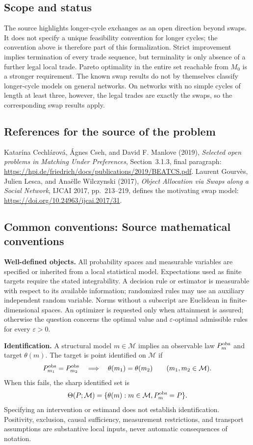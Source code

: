 \documentclass[11pt,a4paper]{article}
\begin{document}
\subsection*{Scope and status}
The source highlights longer-cycle exchanges as an open direction beyond swaps. It does not specify a unique feasibility convention for longer cycles; the convention above is therefore part of this formalization. Strict improvement implies termination of every trade sequence, but terminality is only absence of a further legal local trade. Pareto optimality in the entire set reachable from $M_0$ is a stronger requirement. The known swap results do not by themselves classify longer-cycle models on general networks. On networks with no simple cycles of length at least three, however, the legal trades are exactly the swaps, so the corresponding swap results apply.
\subsection*{References for the source of the problem}
Katar\'ina Cechl\'arov\'a, \'Agnes Cseh, and David F. Manlove (2019), \emph{Selected open problems in Matching Under Preferences}, Section~3.1.3, final paragraph: \url{https://hpi.de/friedrich/docs/publications/2019/BEATCS.pdf}. Laurent Gourv\`es, Julien Lesca, and Ana\"elle Wilczynski (2017), \emph{Object Allocation via Swaps along a Social Network}, IJCAI 2017, pp.~213--219, defines the motivating swap model: \url{https://doi.org/10.24963/ijcai.2017/31}.

\subsection*{Common conventions: Source mathematical conventions}

\textbf{Well-defined objects.}
All probability spaces and measurable variables are specified or inherited
from a local statistical model. Expectations used as finite targets require
the stated integrability. A decision rule or estimator is measurable with
respect to its available information; randomized rules may use an auxiliary
independent random variable. Norms without a subscript are Euclidean in
finite-dimensional spaces. An optimizer is requested only when attainment
is assured; otherwise the question concerns the optimal value and
$\varepsilon$-optimal admissible rules for every $\varepsilon>0$.

\textbf{Identification.}
A structural model $m\in\mathcal M$ implies an observable law
$P_m^{\rm obs}$ and target $\theta(m)$. The target is point identified on
$\mathcal M$ if
\[
 P_{m_1}^{\rm obs}=P_{m_2}^{\rm obs}
 \quad\Longrightarrow\quad\theta(m_1)=\theta(m_2)
 \qquad(m_1,m_2\in\mathcal M).
\]
When this fails, the sharp identified set is
\[
 \Theta(P;\mathcal M)=\{\theta(m):m\in\mathcal M,
                                  P_m^{\rm obs}=P\}.
\]
Specifying an intervention or estimand does not establish identification.
Positivity, exclusion, causal sufficiency, measurement restrictions, and
transport assumptions are substantive local inputs, never automatic
consequences of notation.
\end{document}
